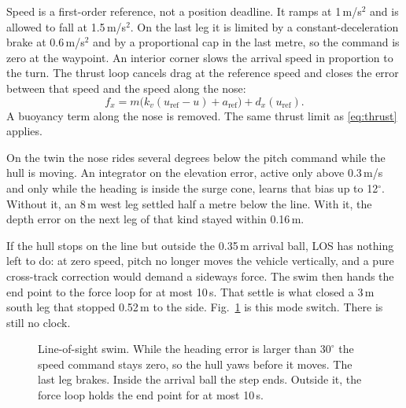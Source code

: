 \documentclass[conference]{IEEEtran}
\begin{document}
Speed is a first-order reference, not a position deadline. It ramps at 1\,m/s$^{2}$ and is allowed to fall at 1.5\,m/s$^{2}$. On the last leg it is limited by a constant-deceleration brake at 0.6\,m/s$^{2}$ and by a proportional cap in the last metre, so the command is zero at the waypoint. An interior corner slows the arrival speed in proportion to the turn. The thrust loop cancels drag at the reference speed and closes the error between that speed and the speed along the nose:
\begin{equation}
f_{x} = m\big(k_{v}(u_{\mathrm{ref}}-u) + a_{\mathrm{ref}}\big) + d_{x}(u_{\mathrm{ref}}).
\label{eq:surge}
\end{equation}
A buoyancy term along the nose is removed. The same thrust limit as \eqref{eq:thrust} applies.

On the twin the nose rides several degrees below the pitch command while the hull is moving. An integrator on the elevation error, active only above 0.3\,m/s and only while the heading is inside the surge cone, learns that bias up to 12$^\circ$. Without it, an 8\,m west leg settled half a metre below the line. With it, the depth error on the next leg of that kind stayed within 0.16\,m.

If the hull stops on the line but outside the 0.35\,m arrival ball, LOS has nothing left to do: at zero speed, pitch no longer moves the vehicle vertically, and a pure cross-track correction would demand a sideways force. The swim then hands the end point to the force loop for at most 10\,s. That settle is what closed a 3\,m south leg that stopped 0.52\,m to the side. Fig.~\ref{fig:swim} is this mode switch. There is still no clock.

\begin{figure}[t]
\centering
{}
\caption{Line-of-sight swim. While the heading error is larger than $30^\circ$ the speed command stays zero, so the hull yaws before it moves. The last leg brakes. Inside the arrival ball the step ends. Outside it, the force loop holds the end point for at most 10\,s.}
\label{fig:swim}
\end{figure}
\end{document}
